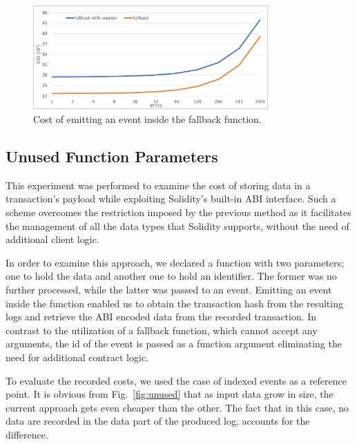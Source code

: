 \begin{figure}[htbp]
\centerline{\includegraphics[width=9cm]{figs/fallback.pdf}}
\caption{Cost of emitting an event inside the fallback function.}
\label{fig:fallback}
\end{figure}

\subsection{Unused Function Parameters}\label{subsection:}
This experiment was performed to examine the cost of storing data in a transaction’s payload while exploiting Solidity’s built-in ABI interface.
Such a scheme overcomes the restriction imposed by the previous method as it facilitates the management of all the data types that Solidity supports, without the need of additional client logic. 

In order to examine this approach, we declared a function with two parameters; one to hold the data and another one to hold an identifier. The former was no further processed, while the latter was passed to an event. Emitting an event inside the function enabled us to obtain the transaction hash from the resulting logs and retrieve the ABI encoded data from the recorded transaction. In contrast to the utilization of a fallback function, which cannot accept any arguments, the id of the event is passed as a function argument eliminating the need for additional contract logic.

To evaluate the recorded costs, we used the case of indexed events as a reference point. It is obvious from Fig.~\ref{fig:unused} that as input data grow in size, the current approach gets even cheaper than the other. The fact that in this case, no data are recorded in the data part of the produced log, accounts for the difference.

